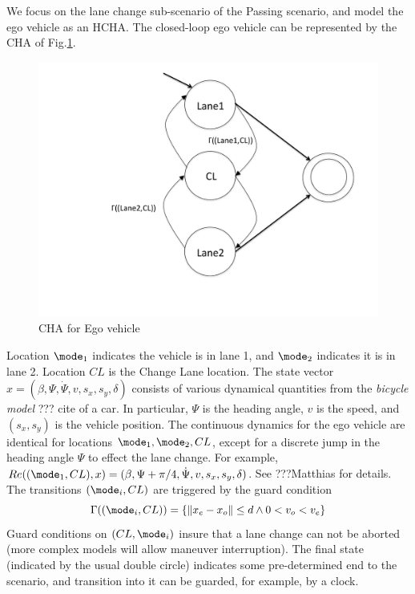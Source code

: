 \begin{exmp}
	We focus on the lane change sub-scenario of the Passing scenario, and model the ego vehicle as an HCHA.
	The closed-loop ego vehicle can be represented by the CHA of Fig.\ref{fig:LaneChangeHCHA}.
	\begin{figure}[t]
\centering
\includegraphics[scale=0.3]{figures/LaneChangeHCHA}
\caption{CHA for Ego vehicle}
\label{fig:LaneChangeHCHA}
\end{figure}
	Location $\mode_1$ indicates the vehicle is in lane 1, and $\mode_2$ indicates it is in lane 2.
	Location $CL$ is the Change Lane location.
	The state vector $x = (\beta,\Psi,\dot{\Psi}, v, s_x, s_y, \delta)$
	consists of various dynamical quantities from the \emph{bicycle model} ??? cite of a car.
	In particular, $\Psi$ is the heading angle, $v$ is the speed, and $(s_x,s_y)$ is the vehicle position.
	The continuous dynamics for the ego vehicle are identical for locations $\mode_1,\mode_2,CL$, except for a discrete jump in the heading angle $\Psi$ to effect the lane change.
	For example,
	$\reset((\mode_1,CL),x) =  (\beta,\Psi+\pi/4,\dot{\Psi}, v, s_x, s_y, \delta)$.
	See ???Matthias for details.
	The transitions $(\mode_i, CL)$ are triggered by the guard condition 
	\[\guard((\mode_i,CL)) = \{\|x_e - x_o\| \leq d \land 0 < v_o < v_e\}\]
	Guard conditions on $(CL,\mode_i)$ insure that a lane change can not be aborted (more complex models will allow maneuver interruption).
	The final state (indicated by the usual double circle) indicates some pre-determined end to the scenario, and transition into it can be guarded, for example, by a clock.
	\end{exmp}
